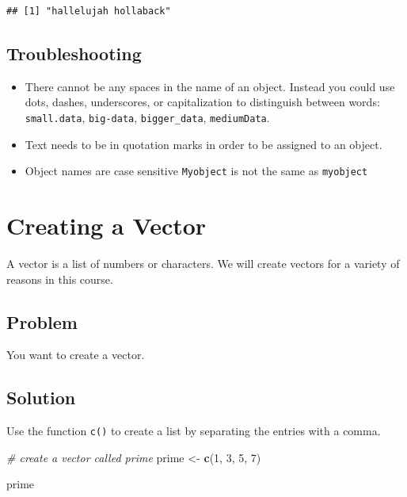 \documentclass[
]{book}
\newenvironment{Shaded}{\begin{snugshade}}{\end{snugshade}}
\newcommand{\CommentTok}[1]{\textcolor[rgb]{0.56,0.35,0.01}{\textit{#1}}}
\newcommand{\DecValTok}[1]{\textcolor[rgb]{0.00,0.00,0.81}{#1}}
\newcommand{\FunctionTok}[1]{\textcolor[rgb]{0.13,0.29,0.53}{\textbf{#1}}}
\newcommand{\NormalTok}[1]{#1}
\newcommand{\OtherTok}[1]{\textcolor[rgb]{0.56,0.35,0.01}{#1}}
\providecommand{\tightlist}{%
  \setlength{\itemsep}{0pt}\setlength{\parskip}{0pt}}
\begin{document}
\begin{verbatim}
## [1] "hallelujah hollaback"
\end{verbatim}

\hypertarget{troubleshooting-1}{%
\subsection{Troubleshooting}\label{troubleshooting-1}}

\begin{itemize}
\tightlist
\item
  There cannot be any spaces in the name of an object. Instead you could use dots, dashes, underscores, or capitalization to distinguish between words: \texttt{small.data}, \texttt{big-data}, \texttt{bigger\_data}, \texttt{mediumData}.
\item
  Text needs to be in quotation marks in order to be assigned to an object.
\item
  Object names are case sensitive \texttt{Myobject} is not the same as \texttt{myobject}
\end{itemize}

\hypertarget{vector}{%
\section{Creating a Vector}\label{vector}}

A vector is a list of numbers or characters. We will create vectors for a variety of reasons in this course.

\hypertarget{problem-2}{%
\subsection{Problem}\label{problem-2}}

You want to create a vector.

\hypertarget{solution-2}{%
\subsection{Solution}\label{solution-2}}

Use the function \texttt{c()} to create a list by separating the entries with a comma.

\begin{Shaded}
\begin{Highlighting}[]
\CommentTok{\# create a vector called \textquotesingle{}prime\textquotesingle{}}
\NormalTok{prime }\OtherTok{\textless{}{-}} \FunctionTok{c}\NormalTok{(}\DecValTok{1}\NormalTok{, }\DecValTok{3}\NormalTok{, }\DecValTok{5}\NormalTok{, }\DecValTok{7}\NormalTok{)}

\NormalTok{prime}
\end{Highlighting}
\end{Shaded}
\end{document}
